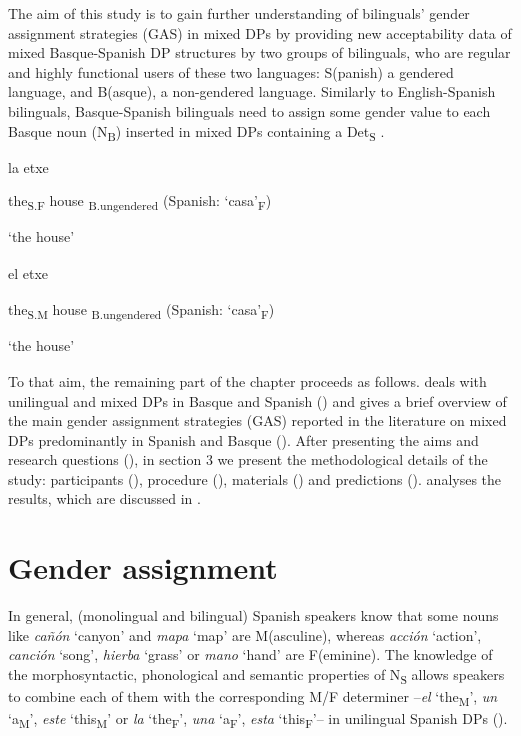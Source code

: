 \documentclass[output=paper]{langscibook}
\begin{document}
{The aim of this study is to gain further understanding of bilinguals’ gender assignment strategies (GAS) in mixed DPs by providing new acceptability data of mixed Basque-Spanish DP structures by two groups of bilinguals, who are regular and highly functional users of these two languages: S(panish) a gendered language, and B(asque), a non-gendered language. Similarly to English-Spanish bilinguals, Basque-Spanish bilinguals need to assign some gender value to each Basque noun (N}{\textsubscript{B}}{) inserted in mixed DPs containing a Det}{\textsubscript{S}} {.}

\ea\label{ex:ezeiza:2}
\ea\label{ex:ezeiza:2a}
{ la  etxe}

 {the}{\textsubscript{S.F}} {house}{\textsubscript{ B.ungendered}} {(Spanish: ‘casa’}{\textsubscript{F}})

 {\textsubscript{} }{‘the house’}

\ex\label{ex:ezeiza:2b}
 { el   etxe}{\textsubscript{} }

 {the}{\textsubscript{S.M}} {house}{\textsubscript{ B.ungendered}} {(Spanish: ‘casa’}{\textsubscript{F}})

 {\textsubscript{} }{‘the house’}

\z
\z

{To that aim, the remaining part of the chapter proceeds as follows.  deals with unilingual and mixed DPs in Basque and Spanish () and gives a brief overview of the main gender assignment strategies (GAS) reported in the literature on mixed DPs predominantly in Spanish and Basque (). After presenting the aims and research questions (), in section 3 we present the methodological details of the study: participants (), procedure} (), materials () and predictions {().  analyses the results, which are discussed in .}

\section{Gender assignment}\label{sec:ezeiza:2}

In general, (monolingual and bilingual) Spanish speakers know that some nouns like \textit{cañón} ‘canyon’ and \textit{mapa} ‘map’ are M(asculine), whereas \textit{acción} ‘action’, \textit{canción} ‘song’, \textit{hierba} ‘grass’ or \textit{mano} ‘hand’ are F(eminine). The knowledge of the morphosyntactic, phonological and semantic properties of N\textsubscript{S} allows speakers to combine each of them with the corresponding M/F determiner –\textit{el} ‘the\textsubscript{M}’, \textit{un} ‘a\textsubscript{M}’, \textit{este} ‘this\textsubscript{M}’ or \textit{la} ‘the\textsubscript{F}’, \textit{una} ‘a\textsubscript{F}’, \textit{esta} ‘this\textsubscript{F}’– in unilingual Spanish DPs (\citealt{Corbett2006,Roca2005}).
\end{document}
